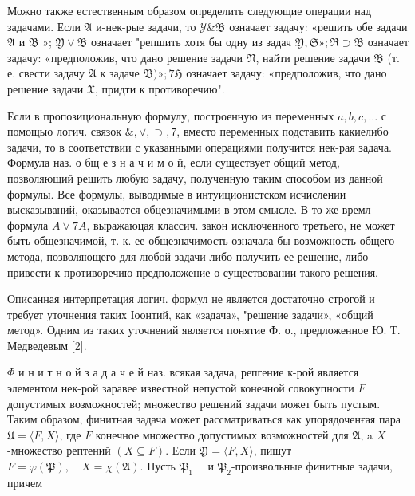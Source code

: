 \documentclass[10pt]{article}
\begin{document}
Можно также естественным образом определить следующие операции над задачами. Если $\mathfrak{A}$ и-нек-рые задачи, то $\mathscr{Y} \& \mathfrak{B}$ означает задачу: «решить обе задачи $\mathfrak{A}$ и $\mathfrak{B}$ »; $\mathfrak{Y} \vee \mathfrak{B}$ означает "репшить хотя бы одну из задач $\mathfrak{Y}, \mathfrak{S} » ; \mathfrak{\Re} \supset \mathfrak{B}$ означает задачу: «предположив, что дано решение задачи $\mathfrak{N}$, найти решение задачи $\mathfrak{B}$ (т. е. свести задачу $\mathfrak{A}$ к задаче $\mathfrak{B}) » ; 7 \mathfrak{H}$ означает задачу: «предположив, что дано решение задачи $\mathfrak{X}$, придти к противоречию".



Если в пропозициональную формулу, построенную из переменных $a, b, c, \ldots$ с помощыо логич. связок $\&, \vee, \supset, 7$, вместо переменных подставить какиелибо задачи, то в соответствии с указанными операциями получится нек-рая задача. Формула наз. о бщ е з н а ч и м о й, если существует общий метод, позволяющий решить любую задачу, полученную таким способом из данной формулы. Все формулы, выводимые в интуиционистском исчислении высказываний, оказываотся обцезначимыми в этом смысле. В то же времл формула $A \vee 7 A$, выражаюцая классич. закон исключенного третьего, не может быть общезначимой, т. к. ее общезначимость означала бы возможность общего метода, позволяющего для любой задачи либо получить ее решение, либо привести к противоречию предположение о существовании такого решения.



Описанная интерпретация логич. формул не является достаточно строгой и требует уточнения таких Іоонтий, как «задача», "решение задачи», «общий метод». Одним из таких уточнений является понятие Ф. о., предложенное Ю. Т. Медведевым [2].



$\Phi$ и н и т н о й з а д а ч е й наз. всякая задача, репгение к-рой является элементом нек-рой заравее известной непустой конечной совокупности $F$ допустимых возможностей; множество решений задачи может быть пустым. Таким образом, финитная задача может рассматриваться как упорядоченғая пара $\mathfrak{U}=\langle F, X\rangle$, где $F$ конечное множество допустимых возможностей для $\mathfrak{A}$, a $X$-множество рептений $(X \subseteq F)$. Если $\mathfrak{Y}=\langle F, X\rangle$, пишут $F=\varphi(\mathfrak{P}), \quad X=\chi(\mathfrak{A})$. Пусть $\mathfrak{P}_{1} \quad$ и $\mathfrak{P}_{2}$-произвольные финитные задачи, причем
\end{document}
